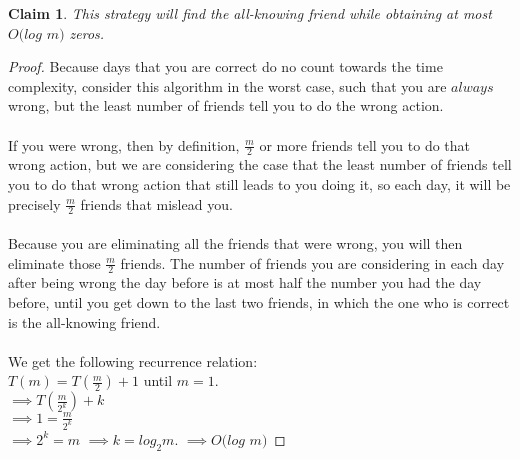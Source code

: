 \documentclass[11pt]{article}
\newtheorem{claim}[theorem]{Claim}
\begin{document}
	\begin{claim} 
		This strategy will find the all-knowing friend while obtaining at most $O(log$ $m)$ zeros.
	\end{claim}
	
	\begin{proof}
		Because days that you are correct do no count towards the time complexity, consider this algorithm in the worst case, such that you are $always$ wrong, but the least number of friends tell you to do the wrong action.\\
		\\
		If you were wrong, then by definition, $\frac{m}{2}$ or more friends tell you to do that wrong action, but we are considering the case that the least number of friends tell you to do that wrong action that still leads to you doing it, so each day, it will be precisely $\frac{m}{2}$ friends that mislead you. \\
		\\
		Because you are eliminating all the friends that were wrong, you will then eliminate those $\frac{m}{2}$ friends. The number of friends you are considering in each day after being wrong the day before is at most half the number you had the day before, until you get down to the last two friends, in which the one who is correct is the all-knowing friend.\\
		\\
		We get the following recurrence relation:\\
		$T(m) = T(\frac{m}{2}) + 1$ until $m = 1$.\\
		$\implies T(\frac{m}{2^k}) + k$\\
		$\implies 1 = \frac{m}{2^k}$\\
		$\implies 2^k = m$
		$\implies k = log_2 m$. 
		$\implies O(log$ $m)$
		
	\end{proof}
	\newpage	
\end{document}
